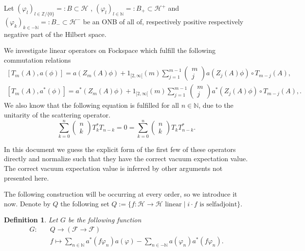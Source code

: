 \documentclass[oneside,reqno,12pt]{amsart}
\newtheorem{Def}{Definition}[section]
\begin{document}
Let \((\varphi_l)_{l\in\mathbb{Z}/\{0\}}=:B \subset \mathcal{H}\) , \((\varphi_l)_{l\in\mathbb{N}}=:B_+ \subset \mathcal{H}^+\) 
and \((\varphi_k)_{k\in -\mathbb{N}}=:B_-\subset \mathcal{H}^-\) be an ONB of all of, respectively positive respectively negative part of the Hilbert space. 

We investigate linear operators on Fockspace which fulfill the following commutation relations
\begin{align}
\left[T_m(A) , a(\phi)\right]= a\left(Z_m (A) \phi \right) + 1_{[2,\infty[}(m)\sum_{j=1}^{m-1} \begin{pmatrix} m \\ j \end{pmatrix} a\left(Z_j (A) \phi \right)\circ T_{m-j}(A), \label{Tk_commutation_relation_annihilator}\\
\left[T_m(A) , a^*(\phi)\right]= a^*\left(Z_m (A) \phi \right) + 1_{[2,\infty[}(m)\sum_{j=1}^{m-1} \begin{pmatrix} m \\ j \end{pmatrix} a^*\left(Z_j (A) \phi \right)\circ T_{m-j}(A),\label{Tk_commutation_relation_creator}
.\end{align}
We also know that the following equation is fulfilled for all \(n\in\mathbb{N}\), due to the unitarity of the scattering operator.
\begin{equation}\label{unitarity}
\sum_{k=0}^n \begin{pmatrix}n \\ k\end{pmatrix} T_{k}^* T_{n-k}=0=\sum_{k=0}^n \begin{pmatrix}n \\ k\end{pmatrix} T_k T_{n-k}^*
.\end{equation}

In this document we guess the explicit form of the first few of these operators directly and normalize such that they have the correct vacuum expectation value. The correct vacuum expectation value is inferred by other arguments not presented here.

The following construction will be occurring at every order, so we introduce it now. Denote by \(Q\) the following set \(Q:=\{f: \mathcal{H}\rightarrow \mathcal{H} \text{ linear} \mid i \cdot f \text{ is selfadjoint}\}\).
\begin{Def}
 Let \(G\) be the following function
\begin{align*}\tag{Def G} \label{Def G}
G: \quad & Q\rightarrow \left( \mathcal{F}\rightarrow \mathcal{F} \right)\\
& f\mapsto \sum_{n\in\mathbb{N}}a^*(f \varphi_n) a(\varphi) - \sum_{n\in -\mathbb{N}} a(\varphi_n) a^*(f \varphi_n).
\end{align*}
\end{Def}
\end{document}
